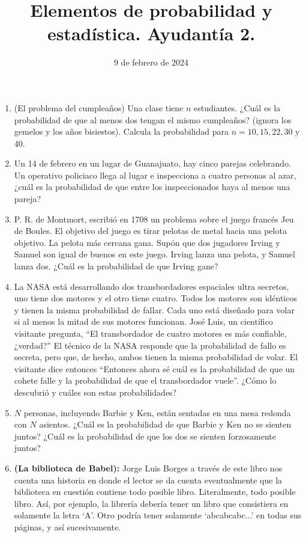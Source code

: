 \documentclass{article}
\title{Elementos de probabilidad y estadística. Ayudantía 2.}
\date{9 de febrero de 2024}
\begin{document}
\maketitle


\begin{enumerate}
    \item (El problema del cumpleaños) Una clase tiene $n$ estudiantes. ¿Cuál es la
    probabilidad de que al menos dos tengan el mismo cumpleaños? (ignora los gemelos
    y los años bisiestos). Calcula la probabilidad para $n=10,15,22,30$ y 40.

    \item Un 14 de febrero en un lugar de Guanajuato, hay cinco parejas celebrando.
    Un operativo policiaco llega al lugar e inspecciona a cuatro personas al azar,
    ¿cuál es la probabilidad de que entre los inspeccionados haya al menos una pareja?

    \item P. R. de Montmort, escribió en 1708 un problema sobre el juego francés
    Jeu de Boules.  El objetivo del juego es  tirar pelotas de metal hacia una pelota 
    objetivo.  La pelota más cercana gana.  Supón que dos jugadores Irving y Samuel son igual
    de buenos en este juego. Irving lanza una pelota, y Samuel lanza dos. ¿Cuál es la
    probabilidad de que Irving gane?

    \item La NASA está desarrollando dos transbordadores espaciales ultra secretos,
    uno tiene dos motores y el otro tiene cuatro.  Todos los motores son idénticos 
    y tienen la misma probabilidad de fallar.  Cada uno está diseñado para volar si 
    al menos la mitad de sus motores funcionan.  José Luis, un científico visitante pregunta,
    ``El transbordador de cuatro motores es más confiable, ¿verdad?'' El técnico de
    la NASA responde que la probabilidad de fallo es secreta, pero que, de hecho, 
    ambos tienen la misma probabilidad de volar. El visitante dice entonces ``Entonces
    ahora sé cuál es la probabilidad de que un cohete falle y la probabilidad de que
    el transbordador vuele''. ¿Cómo lo descubrió y cuáles son estas probabilidades?
    
        \item $N$ personas, incluyendo Barbie y Ken, están sentadas en una mesa redonda con $N$ asientos. 
    ¿Cuál es la probabilidad de que Barbie y Ken no se sienten juntos? ¿Cuál es la probabilidad de que los dos 
    se sienten forzosamente juntos?
    \item \textbf{(La biblioteca de Babel):} Jorge Luis Borges a través de este libro nos cuenta una historia en donde 
    el lector se da cuenta eventualmente que la biblioteca en cuestión contiene todo posible libro. Literalmente, todo posible libro. 
    Así, por ejemplo, la librería debería tener un libro que consistiera en solamente la letra `A'. Otro podría 
    tener solamente `abcabcabc...' en todas sus páginas, y así sucesivamente.\\


\end{enumerate}
\end{document}
